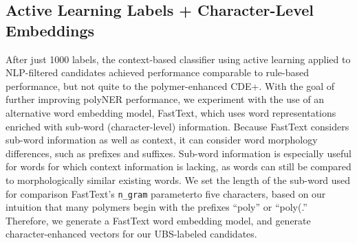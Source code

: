 \subsection{Active Learning Labels + Character-Level Embeddings}
\label{sec:results}
After just 1000 labels, the context-based classifier using active learning applied to NLP-filtered candidates achieved performance comparable to rule-based performance, 
but not quite to the polymer-enhanced CDE+.
With the goal of further improving polyNER performance,
we experiment with the use of an alternative word embedding model, FastText, which 
uses word representations enriched with sub-word (character-level) information.
Because FastText considers sub-word information as well as
context, it can consider word morphology differences, such as prefixes
and suffixes. Sub-word information is especially useful for words for which
context information is lacking, as words can still be compared to morphologically similar
existing words. We set the length of the sub-word used for comparison\textemdash
FastText's \texttt{n_gram} parameter\textemdash to five characters, based on our intuition that
many polymers begin with the prefixes ``poly'' or ``poly(.'' 
Therefore, we generate a FastText word embedding model, 
and generate character-enhanced vectors for our UBS-labeled candidates.

